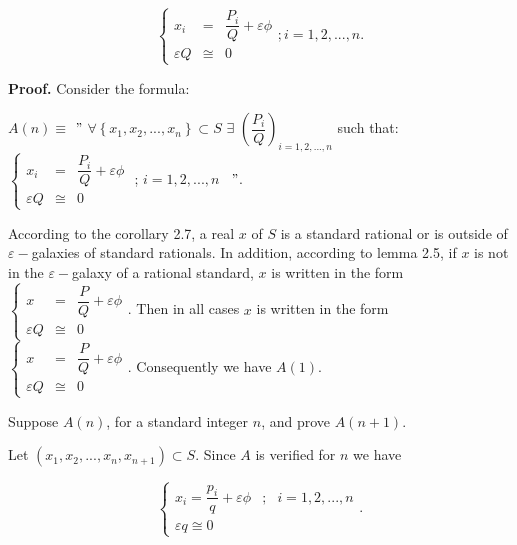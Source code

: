 \documentclass[12pt]{article}
\begin{document}
\begin{center}
\begin{equation}
\left\{ 
\begin{array}{ccc}
x_{i} & = & \dfrac{P_{i}}{Q}+\varepsilon \phi \\ 
\varepsilon Q & \cong & 0%
\end{array}%
\right. ;i=1,2,...,n\text{.}  \tag{2.6}
\end{equation}
\end{center}

\noindent \textbf{Proof. }Consider the formula:

\begin{center}
$A(n)\equiv $ $"$ $\forall \left\{ x_{1},x_{2},...,x_{n}\right\} \subset S$ $%
\exists $ $\left( \dfrac{P_{i}}{Q}\right) _{i=1,2,...,n}$ such that:$\left\{ 
\begin{array}{ccc}
x_{i} & = & \dfrac{P_{i}}{Q}+\varepsilon \phi \\ 
\varepsilon Q & \cong & 0%
\end{array}%
\right. $ ; $i=1,2,...,n$ \ $"$.
\end{center}

\noindent According to the corollary 2.7, a real $x$ of $S$ is a standard
rational or is outside of $\varepsilon -$galaxies of standard rationals. In
addition, according to lemma 2.5, if $x$ is not in the $\varepsilon -$galaxy
of a rational standard, $x$ is written in the form $\left\{ 
\begin{array}{ccc}
x & = & \dfrac{P}{Q}+\varepsilon \phi \\ 
\varepsilon Q & \cong & 0%
\end{array}%
\right. $. Then in all cases $x$ is written in the form $\left\{ 
\begin{array}{ccc}
x & = & \dfrac{P}{Q}+\varepsilon \phi \\ 
\varepsilon Q & \cong & 0%
\end{array}%
\right. $. Consequently we have $A\left( 1\right) $.

\noindent Suppose $A\left( n\right) $, for a standard integer $n$, and prove 
$A\left( n+1\right) $.

\noindent Let $\left( x_{1},x_{2},...,x_{n},x_{n+1}\right) \subset S$. Since 
$A$ is verified for $n$ we have

\begin{center}
\begin{equation}
\left\{ 
\begin{array}{ccc}
x_{i}=\dfrac{p_{i}}{q}+\varepsilon \phi & ; & i=1,2,...,n \\ 
\varepsilon q\cong 0 &  & 
\end{array}%
\text{.}\right.  \tag{2.7}
\end{equation}
\end{center}
\end{document}
